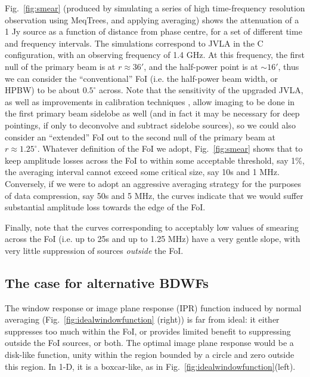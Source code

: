 \documentclass[useAMS,usenatbib]{mn2e}
\newcommand{\ATM}[1]{\textcolor{blue}{{\bf Marcellin: #1}}}
\newcommand{\GSF}[1]{\textcolor{red}{{\bf GSF: #1}}}
\begin{document}
Fig.~\ref{fig:smear} (produced by simulating a series of high time-frequency resolution observation using MeqTrees\citep{noordam2010meqtrees}, and 
applying averaging) shows the attenuation of a 1 Jy source as a function of distance
from phase centre, for a set of different time and frequency intervals. The simulations correspond to JVLA 
in the C configuration, with an observing frequency of 1.4 GHz. At this frequency, the first null of the primary beam is at 
$r\approx36'$, and the half-power point is at $\sim16'$, thus we can consider the ``conventional'' FoI (i.e. the half-power 
beam width, or HPBW) to be about $0.5^\circ$ across. Note that the sensitivity of the upgraded JVLA, as well as
improvements in calibration techniques \citep{Perley-3C147}, allow imaging to be done in the first primary beam sidelobe as well
(and in fact it may be necessary for deep pointings, if only to deconvolve and subtract sidelobe sources), so we could also
consider an ``extended'' FoI out to the second null of the primary beam at $r\approx1.25^\circ$. Whatever definition
of the FoI we adopt, Fig.~\ref{fig:smear} shows that to keep amplitude losses across
the FoI to within some acceptable threshold, say 1\%, the averaging interval cannot exceed some critical size,
say 10s and 1 MHz. Conversely, if we were to adopt an aggressive averaging strategy for the purposes of data 
compression, say 50s and 5 MHz, the curves indicate that we would suffer substantial amplitude loss towards the 
edge of the FoI. 

Finally, note that the curves corresponding to acceptably low values of smearing across the FoI (i.e. up to 25s and 
up to 1.25 MHz) have a very gentle slope, with very little suppression of sources \emph{outside} the FoI. 

\subsection{The case for alternative BDWFs}

The window response or image plane response (IPR) function induced by normal averaging (Fig.~\ref{fig:idealwindowfunction} (right)) is far from ideal: it either suppresses too much within 
the FoI, or provides limited benefit to suppressing outside the FoI sources, or both. The optimal image plane response would be 
a  disk-like function, unity within the region  bounded by a circle and zero outside this region. In 1-D, it is a 
boxcar-like, as in Fig.~\ref{fig:idealwindowfunction}(left).
% 
\end{document}
